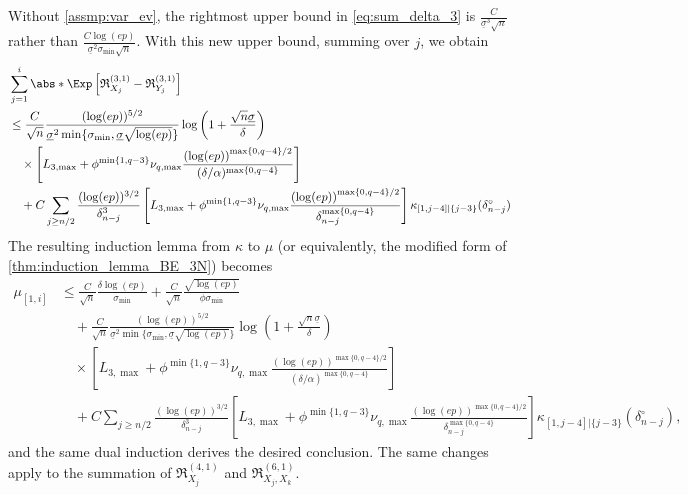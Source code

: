 \documentclass[aos]{imsart}
\begin{document}
Without \eqref{assmp:var_ev},
the rightmost upper bound in \cref{eq:sum_delta_3} is $\frac{C}{\underline{\sigma}^3\sqrt{n}}$ rather than $\frac{C \log(ep)}{\underline{\sigma}^2\sigma_{\min}\sqrt{n}}$. With this new upper bound, summing over $j$, we obtain
\begin{equation*}
\begin{aligned}
    & \sum_{j=1}^{i} \abs*{ \Exp \left[ \mathfrak{R}_{X_j}^{(3,1)} 
        - \mathfrak{R}_{Y_j}^{(3,1)} \right] } \\
    & \leq \frac{C}{\sqrt{n}} \frac{(\log(ep))^{5/2}}{\underline{\sigma}^2 \min\{\sigma_{\min}, \underline{\sigma} \sqrt{\log(ep)}\}}
    \log\left(1 + \frac{\sqrt{n}\underline{\sigma}}{\delta}\right)
    \\
    & \quad \times \left[ 
        {L}_{3,\max} + \phi^{\min\{1, q-3\}} \nu_{q,\max} \frac{ {(\log(ep))}^{\max\{0, q-4\}/2}}{(\delta/\alpha)^{\max\{0, q-4\}}}
    \right]\\
    & \quad + C \sum_{j \geq {n/2}} \frac{(\log(ep))^{3/2}}{\delta_{n-j}^3} \left[ 
        {L}_{3,\max} + \phi^{\min\{1, q-3\}} \nu_{q,\max} \frac{ {(\log(ep))}^{\max\{0, q-4\}/2}}{\delta_{n-j}^{\max\{0, q-4\}}}
    \right] \kappa_{[1,j-4]|\{j-3\}}(\delta_{n-j}^\circ)
\end{aligned}
\end{equation*}
The resulting induction lemma from $\kappa$ to $\mu$  (or equivalently, the modified form of \cref{thm:induction_lemma_BE_3N}) becomes
\begin{equation*}
\begin{aligned}
    \mu_{[1,i]}
    & \leq \frac{C}{\sqrt{n}} \frac{\delta \log(ep)}{\sigma_{\min}}  
    + \frac{C}{\sqrt{n}} \frac{\sqrt{\log(ep)}}{\phi \sigma_{\min}} \\
    & \quad + \frac{C}{\sqrt{n}} \frac{(\log(ep))^{5/2}}{\underline{\sigma}^2 \min\{\sigma_{\min}, \underline{\sigma} \sqrt{\log(ep)}\}}
    \log\left(1 + \frac{\sqrt{n}\underline{\sigma}}{\delta}\right) \\
    & \quad \times \left[ 
        {L}_{3,\max} + \phi^{\min\{1, q-3\}} \nu_{q,\max} \frac{ {(\log(ep))}^{\max\{0, q-4\}/2}}{(\delta/\alpha)^{\max\{0, q-4\}}}
    \right] \\
    & \quad + C \sum_{j \geq {n/2}} \frac{(\log(ep))^{3/2}}{\delta_{n-j}^3} \left[ 
        {L}_{3,\max} + \phi^{\min\{1, q-3\}} \nu_{q,\max} \frac{ {(\log(ep))}^{\max\{0, q-4\}/2}}{\delta_{n-j}^{\max\{0, q-4\}}}
    \right] \kappa_{[1,j-4]|\{j-3\}}(\delta_{n-j}^\circ),
\end{aligned}
\end{equation*} 
and the same dual induction derives the desired conclusion. The same changes apply to the summation of $\mathfrak{R}^{(4,1)}_{X_j}$ and $\mathfrak{R}^{(6,1)}_{X_j,X_k}$.
\end{document}

